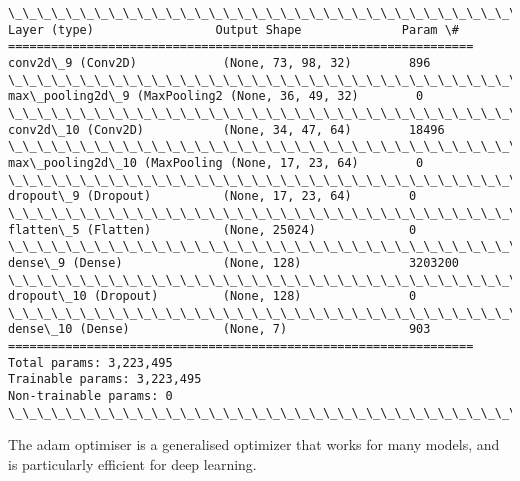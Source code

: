 \documentclass[11pt]{article}
\begin{document}
    \begin{Verbatim}[commandchars=\\\{\}]
\_\_\_\_\_\_\_\_\_\_\_\_\_\_\_\_\_\_\_\_\_\_\_\_\_\_\_\_\_\_\_\_\_\_\_\_\_\_\_\_\_\_\_\_\_\_\_\_\_\_\_\_\_\_\_\_\_\_\_\_\_\_\_\_\_
Layer (type)                 Output Shape              Param \#   
=================================================================
conv2d\_9 (Conv2D)            (None, 73, 98, 32)        896       
\_\_\_\_\_\_\_\_\_\_\_\_\_\_\_\_\_\_\_\_\_\_\_\_\_\_\_\_\_\_\_\_\_\_\_\_\_\_\_\_\_\_\_\_\_\_\_\_\_\_\_\_\_\_\_\_\_\_\_\_\_\_\_\_\_
max\_pooling2d\_9 (MaxPooling2 (None, 36, 49, 32)        0         
\_\_\_\_\_\_\_\_\_\_\_\_\_\_\_\_\_\_\_\_\_\_\_\_\_\_\_\_\_\_\_\_\_\_\_\_\_\_\_\_\_\_\_\_\_\_\_\_\_\_\_\_\_\_\_\_\_\_\_\_\_\_\_\_\_
conv2d\_10 (Conv2D)           (None, 34, 47, 64)        18496     
\_\_\_\_\_\_\_\_\_\_\_\_\_\_\_\_\_\_\_\_\_\_\_\_\_\_\_\_\_\_\_\_\_\_\_\_\_\_\_\_\_\_\_\_\_\_\_\_\_\_\_\_\_\_\_\_\_\_\_\_\_\_\_\_\_
max\_pooling2d\_10 (MaxPooling (None, 17, 23, 64)        0         
\_\_\_\_\_\_\_\_\_\_\_\_\_\_\_\_\_\_\_\_\_\_\_\_\_\_\_\_\_\_\_\_\_\_\_\_\_\_\_\_\_\_\_\_\_\_\_\_\_\_\_\_\_\_\_\_\_\_\_\_\_\_\_\_\_
dropout\_9 (Dropout)          (None, 17, 23, 64)        0         
\_\_\_\_\_\_\_\_\_\_\_\_\_\_\_\_\_\_\_\_\_\_\_\_\_\_\_\_\_\_\_\_\_\_\_\_\_\_\_\_\_\_\_\_\_\_\_\_\_\_\_\_\_\_\_\_\_\_\_\_\_\_\_\_\_
flatten\_5 (Flatten)          (None, 25024)             0         
\_\_\_\_\_\_\_\_\_\_\_\_\_\_\_\_\_\_\_\_\_\_\_\_\_\_\_\_\_\_\_\_\_\_\_\_\_\_\_\_\_\_\_\_\_\_\_\_\_\_\_\_\_\_\_\_\_\_\_\_\_\_\_\_\_
dense\_9 (Dense)              (None, 128)               3203200   
\_\_\_\_\_\_\_\_\_\_\_\_\_\_\_\_\_\_\_\_\_\_\_\_\_\_\_\_\_\_\_\_\_\_\_\_\_\_\_\_\_\_\_\_\_\_\_\_\_\_\_\_\_\_\_\_\_\_\_\_\_\_\_\_\_
dropout\_10 (Dropout)         (None, 128)               0         
\_\_\_\_\_\_\_\_\_\_\_\_\_\_\_\_\_\_\_\_\_\_\_\_\_\_\_\_\_\_\_\_\_\_\_\_\_\_\_\_\_\_\_\_\_\_\_\_\_\_\_\_\_\_\_\_\_\_\_\_\_\_\_\_\_
dense\_10 (Dense)             (None, 7)                 903       
=================================================================
Total params: 3,223,495
Trainable params: 3,223,495
Non-trainable params: 0
\_\_\_\_\_\_\_\_\_\_\_\_\_\_\_\_\_\_\_\_\_\_\_\_\_\_\_\_\_\_\_\_\_\_\_\_\_\_\_\_\_\_\_\_\_\_\_\_\_\_\_\_\_\_\_\_\_\_\_\_\_\_\_\_\_

    \end{Verbatim}

    The adam optimiser is a generalised optimizer that works for many
models, and is particularly efficient for deep learning.
\end{document}

